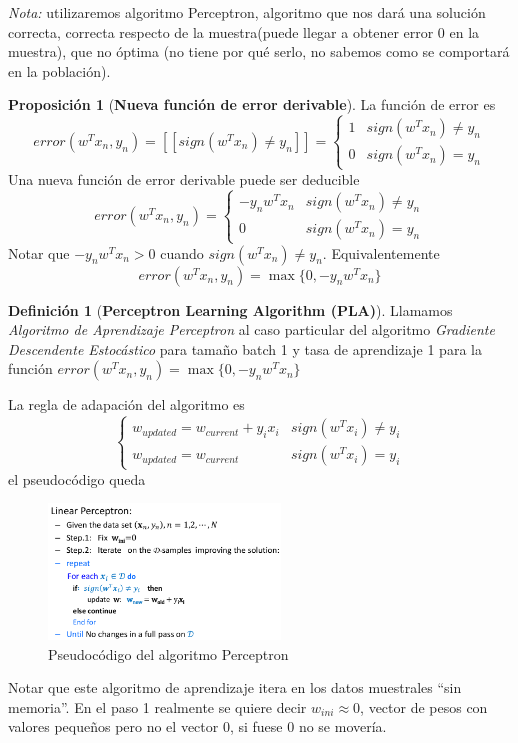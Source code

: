 \documentclass[11pt,a4paper]{article}
\theoremstyle{definition}
\newtheorem{definition}{Definición}[section]
\newtheorem{proposition}{Proposición}[section]
\begin{document}
	\textit{Nota:} utilizaremos algoritmo Perceptron, algoritmo que nos dará una solución correcta, correcta respecto de la muestra(puede llegar a obtener error 0 en la muestra), que no óptima (no tiene por qué serlo, no sabemos como se comportará en la población).
	
	\begin{proposition}[\bf Nueva función de error derivable]
	La función de error es 
	$$error(w^Tx_n,y_n)=[[sign(w^T x_n)\neq y_n]] = \begin{cases}1 & sign(w^T x_n)\neq y_n\\
	0 & sign(w^T x_n) = y_n
	\end{cases}$$
	Una nueva función de error derivable puede ser deducible
	$$error(w^Tx_n,y_n)=\begin{cases} 
	-y_n w^T x_n & sign(w^Tx_n)\neq y_n\\
	0 & sign(w^T x_n)=y_n
	\end{cases}$$
	Notar que $-y_n w^T x_n >0$ cuando $sign(w^Tx_n)\neq y_n$. Equivalentemente
	$$error(w^T x_n, y_n)=\max \{0, -y_n w^T x_n\}$$
	
	\end{proposition}
	
	\begin{definition}[\bf Perceptron Learning Algorithm (PLA)]
		Llamamos \textit{Algoritmo de Aprendizaje Perceptron} al caso particular del algoritmo \textit{Gradiente Descendente Estocástico} para tamaño batch 1 y tasa de aprendizaje 1 para la función $error(w^T x_n, y_n)=\max \{0, -y_n w^T x_n\}$
		
		La regla de adapación del algoritmo es 
		$$\begin{cases}
		w_{updated} = w_{current} +y_ix_i & sign(w^Tx_i) \neq y_i\\
		w_{updated} = w_{current} & sign(w^Tx_i) = y_i
		\end{cases}$$
		el pseudocódigo queda
		
	\begin{figure}[H]
	\centering
	\includegraphics[width=0.55\textwidth]{images/perceptron_alg}
	\caption{Pseudocódigo del algoritmo Perceptron}
	\end{figure}
	
	Notar que este algoritmo de aprendizaje itera en los datos muestrales ``sin memoria''. En el paso 1 realmente se quiere decir $w_{ini} \approx 0$, vector de pesos con valores pequeños pero no el vector 0, si fuese 0 no se movería.
	\end{definition}
	
\end{document}
